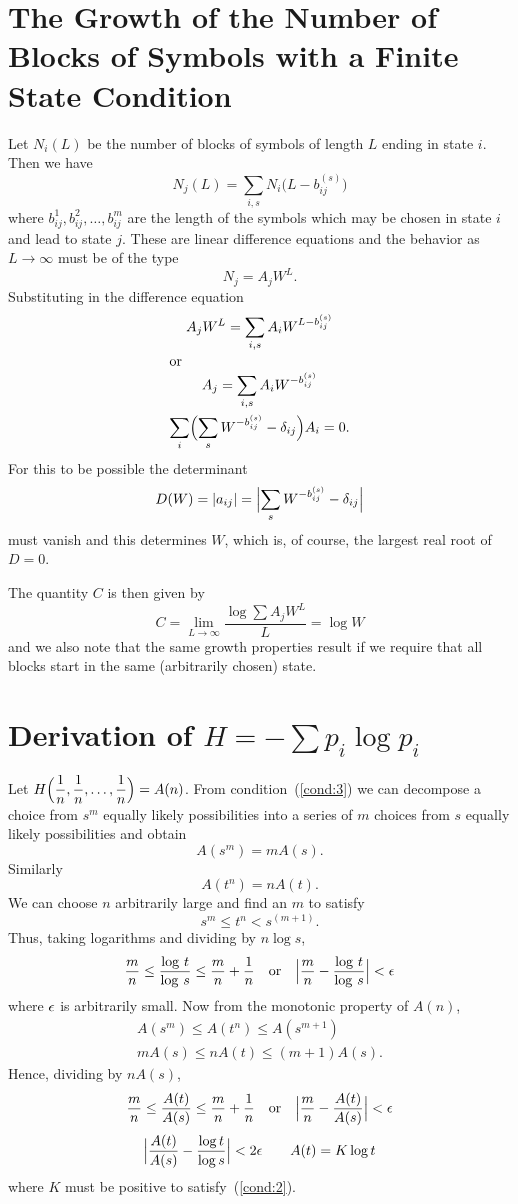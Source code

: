 \appendix
\section{The Growth of the Number of
Blocks of Symbols with a Finite State Condition}
\label{ap:1}

Let $N_i(L)$ be the number of blocks of symbols of length $L$ ending in
state $i$.  Then we have
$$
N_j(L)=\sum_{i,s}N_i\big(L-b_{ij}^{(s)}\bigr)
$$
where $b_{ij}^1,b_{ij}^2,\dots,b_{ij}^m$ are the length of the symbols which
may be chosen in state $i$ and lead to state $j$.  These are linear
difference equations and the behavior as $L\to\infty$ must be of the
type
$$
N_j=A_j W^L.
$$
Substituting in the difference equation
\begin{gather*}
A_j W^L=\sum_{i,s} A_i W^{L-b_{ij}^{(s)}}\\
\intertext{or}
A_j=\sum_{i,s} A_i W^{-b_{ij}^{(s)}}\\
\sum_i\Bigl(\sum_{s}
    W^{-b_{ij}^{(s)}}-\delta_{ij}\Bigr)A_i=0.
\end{gather*}
For this to be possible the determinant
$$
D(W)=|a_{ij}|=\Bigl|\sum_{s}
  W^{-b_{ij}^{(s)}}-\delta_{ij}\Bigr|
$$
must vanish and this determines $W$, which is, of course, the largest real
root of $D=0$.

The quantity $C$ is then given by
$$
C=\lim_{L\to\infty}\frac{\log\sum A_j W^L}{L}=\log W
$$
and we also note that the same growth properties result if we require that
all blocks start in the same (arbitrarily chosen) state.

\section{Derivation of $H=-\sum p_i\log p_i$}
\label{ap:2}

Let $\displaystyle H\Bigl(\frac1n,\frac1n,\dots,\frac1n\Bigr)=A(n)$.  From
condition~(\ref{cond:3}) we can decompose a choice from $s^m$ equally likely
possibilities into a series of $m$ choices from $s$ equally likely
possibilities and obtain
$$
A(s^m)=mA(s).
$$
Similarly
$$
A(t^n)=nA(t).
$$
We can choose $n$ arbitrarily large and find an $m$ to satisfy
$$
s^m\leq t^n<s^{(m+1)}.
$$
Thus, taking logarithms and dividing by $n\log s$,
$$
\frac m n \leq \frac{\log\, t}{\log\, s}\leq
   \frac m n + \frac 1 n
\quad\text{or}\quad
\Bigl|\frac m n - \frac{\log\, t}{\log\, s}\Bigr|<\epsilon
$$
where $\epsilon$ is arbitrarily small.  Now from the monotonic property of
$A(n)$,
\begin{gather*}
A(s^m)\leq A(t^n)\leq A(s^{m+1})\\
m A(s)\leq n A(t) \leq (m+1) A(s).
\end{gather*}
Hence, dividing by $n A(s)$,
$$
\frac m n \leq \frac{A(t)}{A(s)}\leq \frac m n + \frac 1 n
\quad\text{or}\quad
\Bigl|\frac m n - \frac{A(t)}{A(s)}\Bigr|<\epsilon
$$
$$
\Bigl|\frac{A(t)}{A(s)} - \frac{\log t}{\log s}\Bigr|<2\epsilon
\qquad
A(t)=K\log t
$$
where $K$ must be positive to satisfy~(\ref{cond:2}).

